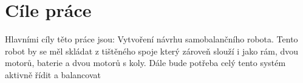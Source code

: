 \chapter*{Cíle práce}
{}

Hlavními cíly těto práce jsou: Vytvoření návrhu samobalančního robota. Tento robot by se měl skládat z tištěného spoje který zároveň slouží i jako rám, dvou motorů, baterie a dvou motorů s koly.
Dále bude potřeba celý tento systém aktivně řídit a balancovat